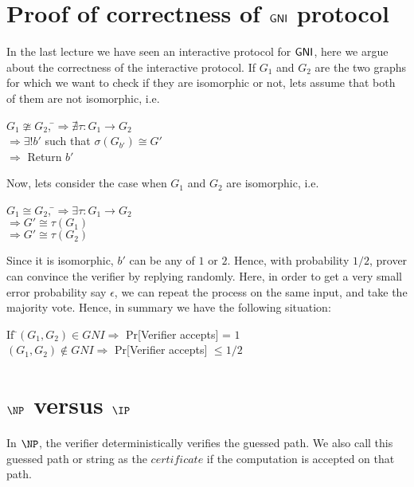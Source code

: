 \renewcommand{\perm}{{\sf perm}}
\newcommand{\GNI}{{\sf GNI}}


\section{Proof of correctness of $\GNI$ protocol}
In the last lecture we have seen an interactive protocol for $\GNI$, here we argue about the
correctness of the interactive protocol. If $G_1$ and $G_2$ are the two graphs for which we want to
check if they are isomorphic or not, lets assume that both of them are not isomorphic, i.e.
\begin{tabbing}
$G_1 \ncong G_2$, \=$\Rightarrow \nexists \tau : G_1 \rightarrow G_2$ \\ 
\>  $\Rightarrow \exists! b'$ such that $\sigma(G_{b'}) \cong G'$ \\
\>  $\Rightarrow$ Return $b'$
\end{tabbing}
Now, lets consider the case when $G_1$ and $G_2$ are isomorphic, i.e.
\begin{tabbing}
$G_1 \cong G_2$, \=$\Rightarrow \exists \tau : G_1 \rightarrow G_2$ \\ 
\>  $\Rightarrow G' \cong \tau(G_1)$ \\
\>  $\Rightarrow G' \cong \tau(G_2)$ \\
\end{tabbing}
Since it is isomorphic, $b'$ can be any of $1$ or $2$. Hence, with probability $1/2$, prover can
convince the verifier by replying randomly. Here, in order to get a very small error probability
say $\epsilon$, we can repeat the process on the same input, and take the majority vote. Hence, in
summary we have the following situation:

\begin{tabbing}
If \=$(G_1, G_2) \in GNI \Rightarrow $ Pr[Verifier accepts] = $1$ \\ 
\>  $(G_1, G_2) \notin GNI \Rightarrow $ Pr[Verifier accepts] $\leq 1/2$ \\
\end{tabbing}

\section{$\NP$ versus $\IP$}
In $\NP$, the verifier deterministically verifies the guessed path. We also call this guessed path
or string as the $certificate$ if the computation is accepted on that path. 

